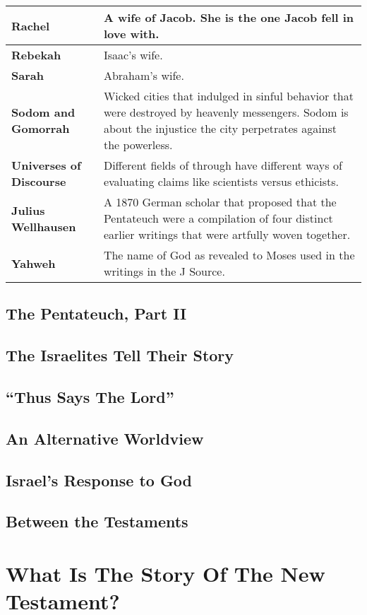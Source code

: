 \documentclass{report}
\begin{document}
\begin{center}
\begin{longtable}{| p{5cm} | p{7cm} |}
                \textbf{Rachel} & A wife of Jacob. She is the one Jacob fell in love with.\\ \hline
                \textbf{Rebekah} & Isaac's wife.\\ \hline
                \textbf{Sarah} & Abraham's wife.\\ \hline
                \textbf{Sodom and Gomorrah} & Wicked cities that indulged in sinful behavior that were destroyed by heavenly messengers. Sodom is about the injustice the city perpetrates against the powerless.\\ \hline
                \textbf{Universes of Discourse} & Different fields of through have different ways of evaluating claims like scientists versus ethicists.\\ \hline
                \textbf{Julius Wellhausen} & A 1870 German scholar that proposed that the Pentateuch were a compilation of four distinct earlier writings that were artfully woven together.\\ \hline
                \textbf{Yahweh} & The name of God as revealed to Moses used in the writings in the J Source.\\ \hline
            \end{longtable}
        \end{center}
    \chapter{The Pentateuch, Part II}
    \chapter{The Israelites Tell Their Story}
    \chapter{``Thus Says The Lord''}
    \chapter{An Alternative Worldview}
    \chapter{Israel's Response to God}
    \chapter{Between the Testaments}

\part{What Is The Story Of The New Testament?}
\end{document}
